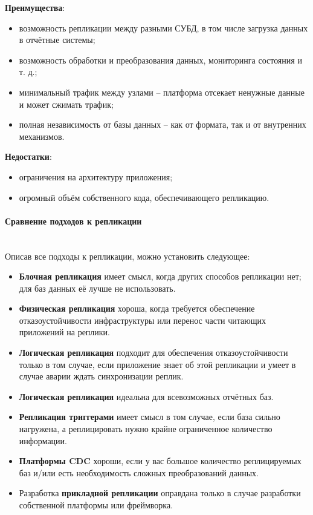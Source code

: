 \textbf{Преимущества}:
\begin{itemize}
    \item возможность репликации между разными СУБД, в том числе загрузка данных в отчётные системы;
    \item возможность обработки и преобразования данных, мониторинга состояния и т. д.;
    \item минимальный трафик между узлами – платформа отсекает ненужные данные и может сжимать трафик;
    \item полная независимость от базы данных – как от формата, так и от внутренних механизмов.
\end{itemize}

\textbf{Недостатки}:
\begin{itemize}
    \item ограничения на архитектуру приложения;
    \item огромный объём собственного кода, обеспечивающего репликацию.
\end{itemize}

\paragraph{Сравнение подходов к репликации} ~\\
Описав все подходы к репликации, можно установить следующее:
\begin{itemize}
    \item \textbf{Блочная репликация} имеет смысл, когда других способов репликации нет; для баз данных её лучше не использовать.
    \item \textbf{Физическая репликация} хороша, когда требуется обеспечение отказоустойчивости инфраструктуры или перенос части читающих приложений на реплики.
    \item \textbf{Логическая репликация} подходит для обеспечения отказоустойчивости только в том случае, если приложение знает об этой репликации и умеет в случае аварии ждать синхронизации реплик.
    \item \textbf{Логическая репликация} идеальна для всевозможных отчётных баз.
    \item \textbf{Репликация триггерами} имеет смысл в том случае, если база сильно нагружена, а реплицировать нужно крайне ограниченное количество информации.
    \item \textbf{Платформы CDC} хороши, если у вас большое количество реплицируемых баз и/или есть необходимость сложных преобразований данных.
    \item Разработка \textbf{прикладной репликации} оправдана только в случае разработки собственной платформы или фреймворка.
\end{itemize} \autocite{Replication}

